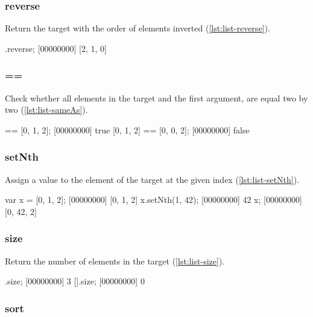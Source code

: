 \subsubsection{reverse}

Return the target with the order of elements inverted
(\autoref{lst:list-reverse}).

\begin{urbiscript}[caption=List.reverse, label=lst:list-reverse, float=\floatposh]
[0, 1, 2].reverse;
[00000000] [2, 1, 0]
\end{urbiscript}

\subsubsection{==}

Check whether all elements in the target and the first argument, are
equal two by two (\autoref{lst:list-sameAs}).

\begin{urbiscript}[caption={List.==}, label=lst:list-sameAs, float=\floatposh]
[0, 1, 2] == [0, 1, 2];
[00000000] true
[0, 1, 2] == [0, 0, 2];
[00000000] false
\end{urbiscript}

\subsubsection{setNth}
\label{sec:std-list-setnth}

Assign a value to the element of the target at the given index
(\autoref{lst:list-setNth}).

\begin{urbiscript}[caption=List.setNth, label=lst:list-setNth, float=\floatposh]
var x = [0, 1, 2];
[00000000] [0, 1, 2]
x.setNth(1, 42);
[00000000] 42
x;
[00000000] [0, 42, 2]
\end{urbiscript}

\subsubsection{size}

Return the number of elements in the target (\autoref{lst:list-size}).

\begin{urbiscript}[caption=List.size, label=lst:list-size, float=\floatposh]
[1, 2, 3].size;
[00000000] 3
[].size;
[00000000] 0
\end{urbiscript}

\subsubsection{sort}

